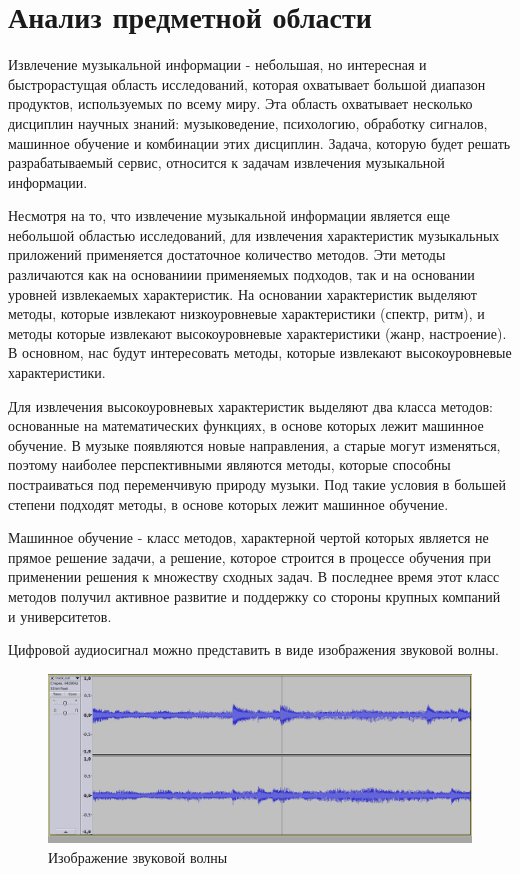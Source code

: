 \section{Анализ предметной области}
\label{sec:analysis}

Извлечение музыкальной информации - небольшая, но интересная и быстрорастущая область исследований, которая охватывает большой диапазон продуктов, используемых по всему миру. Эта область охватывает несколько дисциплин научных знаний: музыковедение, психологию, обработку сигналов, машинное обучение и комбинации этих дисциплин. Задача, которую будет решать разрабатываемый сервис, относится к задачам извлечения музыкальной информации.

Несмотря на то, что извлечение музыкальной информации является еще небольшой областью исследований, для извлечения характеристик музыкальных приложений применяется достаточное количество методов. Эти методы различаются как на основаниии применяемых подходов, так и на основании уровней извлекаемых характеристик. На основании характеристик выделяют методы, которые извлекают низкоуровневые характеристики (спектр, ритм), и методы которые извлекают высокоуровневые характеристики (жанр, настроение). В основном, нас будут интересовать методы, которые извлекают высокоуровневые характеристики.

Для извлечения высокоуровневых характеристик выделяют два класса методов: основанные на математических функциях, в основе которых лежит машинное обучение. В музыке появляются новые направления, а старые могут изменяться, поэтому наиболее перспективными являются методы, которые способны постраиваться под переменчивую природу музыки. Под такие условия в большей степени подходят методы, в основе которых лежит машинное обучение.

Машинное обучение - класс методов, характерной чертой которых является не прямое решение задачи, а решение, которое строится в процессе обучения при применении решения к множеству сходных задач. В последнее время этот класс методов получил активное развитие и поддержку со стороны крупных компаний и университетов.

Цифровой аудиосигнал можно представить в виде изображения звуковой волны.


\begin{figure}
\centering
	\includegraphics[scale=0.14]{attachments/sound_vawe.png}
	\caption{Изображение звуковой волны}
	\label{sec:analysus:sound_wave}
\end{figure}

